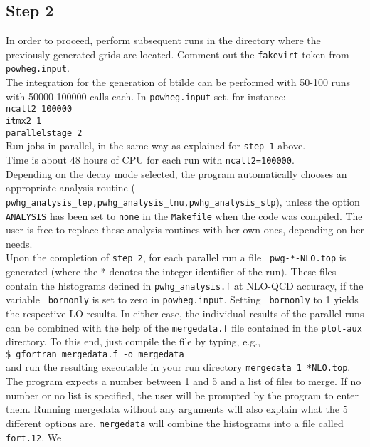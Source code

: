 \documentclass[a4paper,11pt]{article}
\begin{document}
\subsection*{Step 2}
%
In order to proceed, perform subsequent runs in the directory where the previously generated grids are located.
%
Comment out the {\tt fakevirt} token from {\tt powheg.input}. 
\\[2ex]
The integration for the generation of btilde can be
performed with 50-100 runs with 50000-100000 calls each. In {\tt powheg.input} set, for instance:
\\[2ex]
{\tt ncall2 100000}
\\
{\tt itmx2 1}
\\
{\tt parallelstage  2}
\\[2ex]
Run jobs in parallel, in the same way as explained for {\tt step 1} above. 
\\[2ex]
Time is about 48 hours of CPU for each run with {\tt ncall2=100000}.
\\[2ex]
Depending on the decay mode selected, the program automatically
chooses an appropriate analysis routine ({\tt
  pwhg\_analysis\_lep,pwhg\_analysis\_lnu,pwhg\_analysis\_slp}),
unless the option {\tt ANALYSIS} has been set to {\tt none} in the
{\tt Makefile} when the code was compiled. The user is free to replace
these analysis routines with her own ones, depending on her needs.  
\\[2ex]
Upon the completion of {\tt step 2}, for each parallel run a file {\tt
  pwg-*-NLO.top} is generated (where the * denotes the integer
identifier of the run).  These files contain the histograms defined in
{\tt pwhg\_analysis.f} at NLO-QCD accuracy, if the variable {\tt
  bornonly} is set to zero in {\tt powheg.input}.  Setting {\tt
  bornonly} to 1 yields the respective LO results. In either case, the
individual results of the parallel runs can be combined with the help
of the {\tt mergedata.f} file contained in the {\tt plot-aux}
directory.  To this end, just compile the file by typing, e.g.,
\\[2ex]
{\tt \$ gfortran mergedata.f -o mergedata}
\\[2ex]
and run the resulting executable in your run directory
{\tt mergedata 1 *NLO.top}. 
The program expects a number between 1 and 5 and a list of files to
merge. If no number or no list is specified, the user will be prompted
by the program to enter them. Running mergedata without any arguments
will also explain what the 5 different options are. {\tt mergedata}
will combine the histograms into a file called {\tt fort.12}. We
\end{document}

